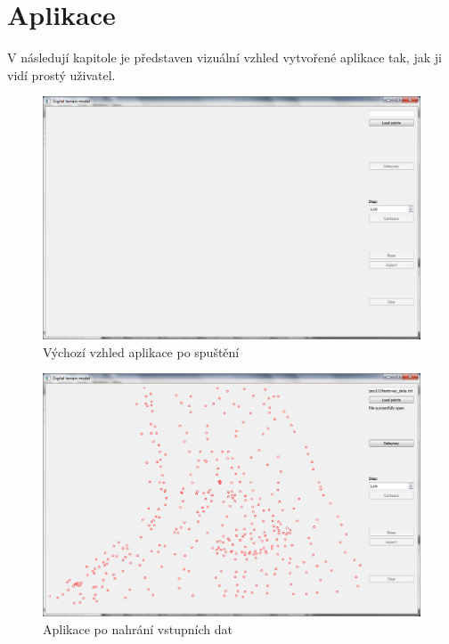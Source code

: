 \documentclass[a4paper, 12pt]{article}
\begin{document}
\clearpage
\section{Aplikace}
V následují kapitole je představen vizuální vzhled vytvořené aplikace tak, jak ji vidí prostý uživatel.

\begin{figure}[h!]
	\centering
	\includegraphics[width=14cm]{./pictures/app_default.png}
	\caption{Výchozí vzhled aplikace po spuštění}
\end{figure}

\begin{figure}[h!]
	\centering
	\includegraphics[width=14cm]{./pictures/app_load_points.png}
	\caption{Aplikace po nahrání vstupních dat}
\end{figure}
\end{document}
